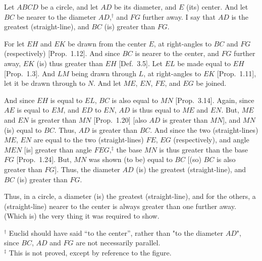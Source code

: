\begin{Parallel}{}{}
{Let $ABCD$ be a circle, and let $AD$ be its diameter, and $E$ (its) center.
And let $BC$ be nearer to the diameter $AD$,$^\dag$ and $FG$ further away. I say that
$AD$ is the greatest (straight-line), and $BC$ (is) greater than $FG$.

For let $EH$ and $EK$ be drawn from the center $E$, at right-angles
to $BC$ and $FG$ (respectively) [Prop.~1.12]. And since $BC$ is nearer to the center, and $FG$ further away, $EK$ (is) thus greater than $EH$ [Def.~3.5]. Let $EL$ be made equal to
$EH$ [Prop.~1.3]. And $LM$ being drawn through $L$, at right-angles to $EK$ [Prop.~1.11], 
let it be drawn through to $N$. And let $ME$, $EN$, $FE$, and $EG$
be joined.

And since $EH$ is equal to $EL$, $BC$ is also equal to $MN$ [Prop.~3.14]. Again,
since $AE$ is equal to $EM$, and $ED$ to $EN$, $AD$ is thus equal to $ME$ and $EN$.
But, $ME$ and $EN$ is greater than $MN$ [Prop.~1.20] [also $AD$ is greater than $MN$], and $MN$ (is) equal to $BC$. Thus, $AD$ is greater than $BC$. And since
the two (straight-lines) $ME$, $EN$ are equal to the two (straight-lines) $FE$, $EG$ (respectively),
and angle $MEN$ [is] greater than angle $FEG$,$^\ddag$ the base $MN$ is thus
greater than the base $FG$ [Prop.~1.24]. But, $MN$ was shown (to be) equal to $BC$ [(so) $BC$ is also greater than $FG$]. Thus, the diameter $AD$ (is) the
greatest (straight-line), and $BC$ (is) greater than $FG$.

\epsfysize=2.2in
\centerline{}

Thus, in a circle, a diameter (is) the greatest (straight-line), and for 
the others, a (straight-line) nearer to the center is always greater than one further away. (Which is) the very thing it was required to show.}
\end{Parallel}
{\footnotesize \noindent$^\dag$ Euclid should have said ``to the center'', rather than "to the diameter $AD$", since $BC$, $AD$ and $FG$ are not necessarily parallel.\\
$^\ddag$  This is not proved,
except by reference to the figure.}

